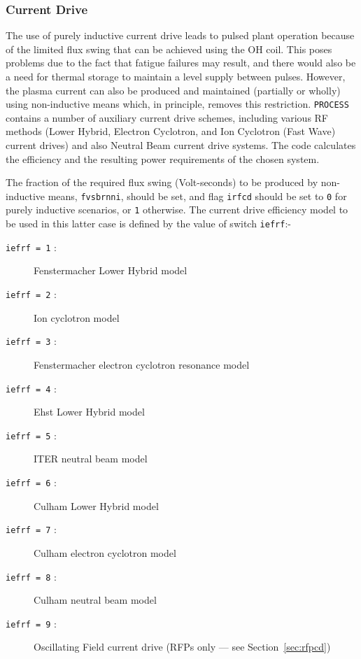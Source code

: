\documentclass[11pt,a4paper]{report}
\newcommand{\process}{\mbox{\texttt{PROCESS}}}
\begin{document}
\subsubsection{Current Drive}

The use of purely inductive current drive leads to pulsed plant operation
because of the limited flux swing that can be achieved using the OH coil. This
poses problems due to the fact that fatigue failures may result, and there
would also be a need for thermal storage to maintain a level supply between
pulses. However, the plasma current can also be produced and maintained
(partially or wholly) using non-inductive means which, in principle, removes
this restriction. \process\/ contains a number of auxiliary current drive
schemes, including various RF methods (Lower Hybrid, Electron Cyclotron, and
Ion Cyclotron (Fast Wave) current drives) and also Neutral Beam current drive
systems. The code calculates the efficiency and the resulting power
requirements of the chosen system.

The fraction of the required flux swing (Volt-seconds) to be produced by
non-inductive means, \texttt{fvsbrnni}, should be set, and flag \texttt{irfcd}
should be set to \texttt{0} for purely inductive scenarios, or \texttt{1}
otherwise. The current drive efficiency model to be used in this latter case
is defined by the value of switch \texttt{iefrf}:-

\begin{description}
\item [\texttt{iefrf = 1} :] Fenstermacher Lower Hybrid model
\item [\texttt{iefrf = 2} :] Ion cyclotron model~\cite{IPDG}
\item [\texttt{iefrf = 3} :] Fenstermacher electron cyclotron resonance model
\item [\texttt{iefrf = 4} :] Ehst Lower Hybrid model
\item [\texttt{iefrf = 5} :] ITER neutral beam model~\cite{IPDG,172}
\item [\texttt{iefrf = 6} :] Culham Lower Hybrid model~\cite{172}
\item [\texttt{iefrf = 7} :] Culham electron cyclotron model~\cite{172}
\item [\texttt{iefrf = 8} :] Culham neutral beam model~\cite{172}
\item [\texttt{iefrf = 9} :] Oscillating Field current drive (RFPs only --- see
Section~\ref{sec:rfpcd})
\end{description}
\end{document}
